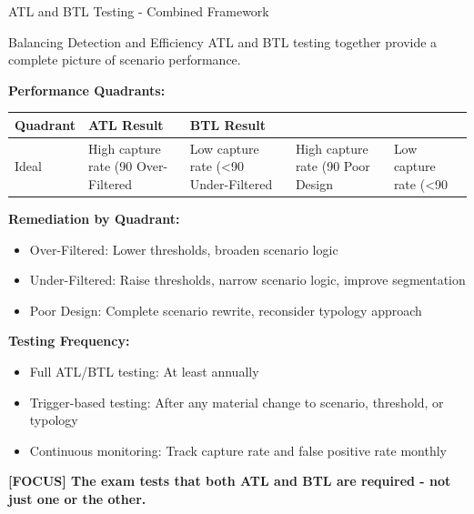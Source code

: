 \documentclass[11pt,a4paper]{beamer}
\newcommand{\examfocus}[1]{\textcolor{orange!80!black}{\textbf{[FOCUS] #1}}}
\begin{document}
	\begin{frame}{ATL and BTL Testing - Combined Framework}
		\begin{block}{Balancing Detection and Efficiency}
			ATL and BTL testing together provide a complete picture of scenario performance.
		\end{block}
		
		\textbf{Performance Quadrants:}
		\begin{longtable}{p{}|p{}|p{}}
			\hline
			\rowcolor{lightgray}
			\textbf{Quadrant} & \textbf{ATL Result} & \textbf{BTL Result} \\
			\hline
			Ideal & High capture rate (90%
			\hline
			Over-Filtered & Low capture rate (<90%
			\hline
			Under-Filtered & High capture rate (90%
			\hline
			Poor Design & Low capture rate (<90%
			\hline
		\end{longtable}
		
		\textbf{Remediation by Quadrant:}
		\begin{itemize}
			\item Over-Filtered: Lower thresholds, broaden scenario logic
			\item Under-Filtered: Raise thresholds, narrow scenario logic, improve segmentation
			\item Poor Design: Complete scenario rewrite, reconsider typology approach
		\end{itemize}
		
		\textbf{Testing Frequency:}
		\begin{itemize}
			\item Full ATL/BTL testing: At least annually
			\item Trigger-based testing: After any material change to scenario, threshold, or typology
			\item Continuous monitoring: Track capture rate and false positive rate monthly
		\end{itemize}
		
		\examfocus{The exam tests that both ATL and BTL are required - not just one or the other.}
	\end{frame}
	
\end{document}
